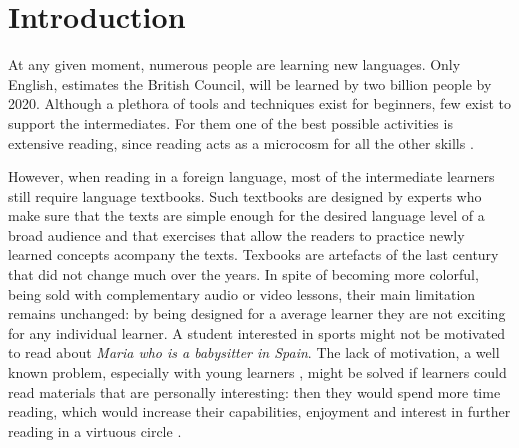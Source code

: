 
\section{Introduction}
At any given moment, numerous people are learning new languages. 
Only English, estimates the British Council, will be learned by two billion people by 2020. 
Although a plethora of tools and techniques exist for beginners, few exist to support the intermediates. For them one of the best possible activities is extensive reading, since reading acts as a microcosm for all the other skills \cite{Day98-Extensive,mccarthy1999-extensive,mccarthy1999-microcosm}. 


However, when reading in a foreign language, most of the intermediate learners still require language textbooks. Such textbooks are designed by experts who make sure that the texts are simple enough for the desired language level of a broad audience and that exercises that allow the readers to practice newly learned concepts acompany the texts. Texbooks are artefacts of the last century that did not change much over the years. In spite of becoming more colorful, being sold with complementary audio or video lessons, their main limitation remains unchanged: 
by being designed for a average learner they are not exciting for any individual learner. A student interested in sports might not be motivated to read about {\em Maria who is a babysitter in Spain}. The lack of motivation, a well known problem, especially with young learners \cite{Hidi00-TheUnmotivated,renadya07-power}, might be solved if learners could read materials that are personally interesting: then they would spend more time reading, which would increase their capabilities, enjoyment and interest in further reading in a virtuous circle \cite{Brozo07-Engagement, Guthrie99-Motivation}.


